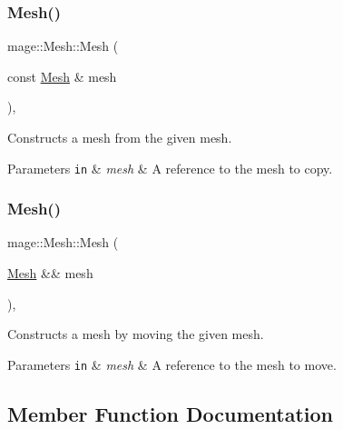 \subsubsection{\texorpdfstring{Mesh()}{Mesh()}\hspace{0.1cm}{\footnotesize\ttfamily [2/3]}}
{\footnotesize\ttfamily mage\+::\+Mesh\+::\+Mesh (\begin{DoxyParamCaption}\item[{const \hyperlink{classmage_1_1_mesh}{Mesh} \&}]{mesh }\end{DoxyParamCaption})\hspace{0.3cm}{\ttfamily [protected]}, {\ttfamily [delete]}}

Constructs a mesh from the given mesh.


\begin{DoxyParams}[1]{Parameters}
\mbox{\tt in}  & {\em mesh} & A reference to the mesh to copy. \\
\hline
\end{DoxyParams}
\hypertarget{classmage_1_1_mesh_a2751abe4790ca150f1fcc285504645ae}{}\label{classmage_1_1_mesh_a2751abe4790ca150f1fcc285504645ae} 
\subsubsection{\texorpdfstring{Mesh()}{Mesh()}\hspace{0.1cm}{\footnotesize\ttfamily [3/3]}}
{\footnotesize\ttfamily mage\+::\+Mesh\+::\+Mesh (\begin{DoxyParamCaption}\item[{\hyperlink{classmage_1_1_mesh}{Mesh} \&\&}]{mesh }\end{DoxyParamCaption})\hspace{0.3cm}{\ttfamily [protected]}, {\ttfamily [default]}}

Constructs a mesh by moving the given mesh.


\begin{DoxyParams}[1]{Parameters}
\mbox{\tt in}  & {\em mesh} & A reference to the mesh to move. \\
\hline
\end{DoxyParams}


\subsection{Member Function Documentation}
\hypertarget{classmage_1_1_mesh_a60b8f36bbab0ae0e3dbae3b6ea013ef5}{}\label{classmage_1_1_mesh_a60b8f36bbab0ae0e3dbae3b6ea013ef5} 
